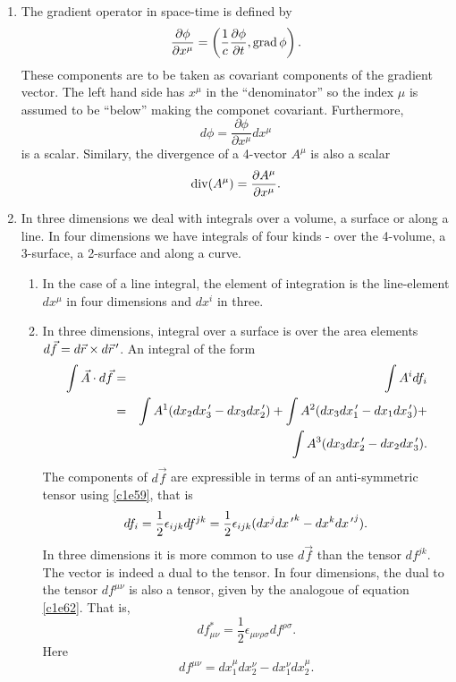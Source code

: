 \begin{enumerate}
\item The gradient operator in space-time is defined by
\begin{equation}\label{c1e65}
\frac{\partial\phi}{\partial x^\mu} = 
\left(\frac{1}{c}\frac{\partial\phi}{\partial t}, \operatorname{grad}\phi\right).
\end{equation}
These components are to be taken as covariant components of the gradient vector.
The left hand side has $x^\mu$ in the ``denominator'' so the index $\mu$ is assumed
to be ``below'' making the componet covariant. Furthermore,
\begin{equation}\label{c1e66}
d\phi = \frac{\partial\phi}{\partial x^\mu}dx^\mu
\end{equation}
is a scalar. Similary, the divergence of a 4-vector $A^\mu$ is also a scalar
\begin{equation}\label{c1e67}
\operatorname{div}(A^\mu) = \frac{\partial A^\mu}{\partial x^\mu}.
\end{equation}

\item In three dimensions we deal with integrals over a volume, a surface or
along a line. In four dimensions we have integrals of four kinds - over the
4-volume, a 3-surface, a 2-surface and along a curve.
\begin{enumerate}
\item In the case of a line integral, the element of integration is the line-element
$dx^\mu$ in four dimensions and $dx^i$ in three.

\item In three dimensions, integral over a surface is over the area elements 
$d\vec{f} = d\vec{r} \times d\vec{r}^{\,\prime}$. An integral of the form
\begin{eqnarray*}
\int \vec{A}\cdot d\vec{f} &=& \int A^i df_i \\
 &=& \int A^1(dx_2dx_3^{\,\prime} - dx_3dx_2^{\,\prime}) + \int A^2(dx_3dx_1^{\,\prime} - dx_1dx_3^{\,\prime}) + \\
 & & \int A^3(dx_3dx_2^{\,\prime} - dx_2dx_3^{\,\prime}).
\end{eqnarray*}
The components of $d\vec{f}$ are expressible in terms of an anti-symmetric tensor 
using \eqref{c1e59}, that is
\begin{equation}\label{c1e68}
df_i = \frac{1}{2}\epsilon_{ijk}df^{jk} = \frac{1}{2}\epsilon_{ijk}(dx^jd{x^{\,\prime}}^k - 
dx^kd{x^{\,\prime}}^j).
\end{equation}
In three dimensions it is more common to use $d\vec{f}$ than the tensor $df^{jk}$.
The vector is indeed a dual to the tensor. In four dimensions, the dual to the
tensor $df^{\mu\nu}$ is also a tensor, given by the analogoue of equation \eqref{c1e62}. 
That is,
\begin{equation}\label{c1e69}
df^\ast_{\mu\nu} = \frac{1}{2}\epsilon_{\mu\nu\rho\sigma}df^{\rho\sigma}.
\end{equation}
Here
\begin{equation}\label{c1e70}
df^{\mu\nu} = dx_1^\mu dx_2^\nu - dx_1^\nu dx_2^\mu.
\end{equation}


\end{enumerate}
\end{enumerate}
